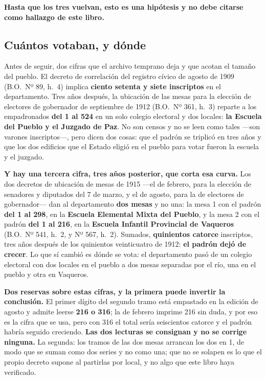 \begin{cautela}
\textbf{Hasta que los tres vuelvan, esto es una hipótesis y no debe citarse como hallazgo de
este libro.}
\end{cautela}

\subsection*{Cuántos votaban, y dónde}

Antes de seguir, dos cifras que el archivo temprano deja y que acotan el tamaño del pueblo. El
decreto de correlación del registro cívico de agosto de 1909 (B.O.\ Nº 89, h.\ 4) implica \textbf{ciento setenta y
siete inscriptos} en el departamento. Tres años después, la ubicación de las mesas para la
elección de electores de gobernador de septiembre de 1912 (B.O.\ Nº 361, h.\ 3) reparte a los empadronados
\textbf{del 1 al 524} en un solo colegio electoral y dos locales: \textbf{la Escuela del Pueblo y
el Juzgado de Paz}. No son censos y no se leen como tales ---son varones inscriptos---, pero
dicen dos cosas: que el padrón se triplicó en tres años y que los dos edificios
que el Estado eligió en el pueblo para votar fueron la escuela y el juzgado.

\textbf{Y hay una tercera cifra, tres años posterior, que corta esa curva.} Los dos decretos de
ubicación de mesas de 1915 ---el de febrero, para la elección de senadores y diputados del 7 de
marzo, y el de agosto, para la de electores de gobernador--- dan al departamento \textbf{dos mesas} y
no una: la mesa 1 con el padrón \textbf{del 1 al 298}, en la \textbf{Escuela Elemental Mixta del
Pueblo}, y la mesa 2 con el padrón \textbf{del 1 al 216}, en la \textbf{Escuela Infantil Provincial de
Vaqueros} (B.O.\ Nº 541, h.\ 2, y Nº 567, h.\ 2). Sumados, \textbf{quinientos catorce} inscriptos,
tres años después de los quinientos veinticuatro de 1912: \textbf{el padrón dejó de crecer}. Lo que sí
cambió es dónde se vota: el departamento pasó de un colegio electoral con dos locales en el pueblo a
dos mesas separadas por el río, una en el pueblo y otra en Vaqueros.

\begin{cautela}
\textbf{Dos reservas sobre estas cifras, y la primera puede invertir la conclusión.} El primer dígito
del segundo tramo está empastado en la edición de agosto y admite leerse \textbf{216 o 316}; la de
febrero imprime 216 sin duda, y por eso es la cifra que se usa, pero con 316 el total sería
seiscientos catorce y el padrón habría seguido creciendo. \textbf{Las dos lecturas se consignan y no se
corrige ninguna.} La segunda: los tramos de las dos mesas arrancan los dos en 1, de modo que se suman
como dos series y no como una; que no se solapen es lo que el propio decreto supone al partirlas por
local, y no algo que este libro haya verificado.
\end{cautela}

